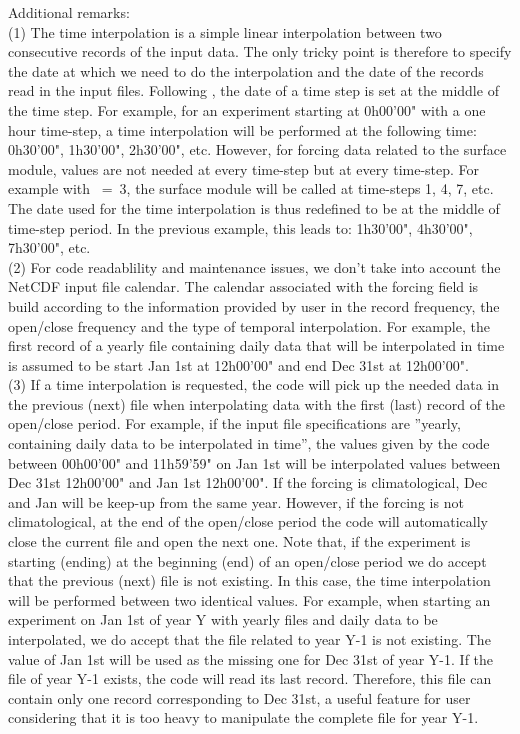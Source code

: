 Additional remarks:\\
(1) The time interpolation is a simple linear interpolation between two consecutive records of 
the input data. The only tricky point is therefore to specify the date at which we need to do 
the interpolation and the date of the records read in the input files. 
Following \citet{Leclair_Madec_OM09}, the date of a time step is set at the middle of the 
time step. For example, for an experiment starting at 0h00'00" with a one hour time-step, 
a time interpolation will be performed at the following time: 0h30'00", 1h30'00", 2h30'00", etc.
However, for forcing data related to the surface module, values are not needed at every 
time-step but at every  time-step. For example with ~=~3, 
the surface module will be called at time-steps 1, 4, 7, etc. The date used for the time interpolation 
is thus redefined to be at the middle of  time-step period. In the previous example, 
this leads to: 1h30'00", 4h30'00", 7h30'00", etc. \\ 
(2) For code readablility and maintenance issues, we don't take into account the NetCDF input file 
calendar. The calendar associated with the forcing field is build according to the information 
provided by user in the record frequency, the open/close frequency and the type of temporal interpolation. 
For example, the first record of a yearly file containing daily data that will be interpolated in time 
is assumed to be start Jan 1st at 12h00'00" and end Dec 31st at 12h00'00". \\
(3) If a time interpolation is requested, the code will pick up the needed data in the previous (next) file 
when interpolating data with the first (last) record of the open/close period. 
For example, if the input file specifications are ''yearly, containing daily data to be interpolated in time'', 
the values given by the code between 00h00'00" and 11h59'59" on Jan 1st will be interpolated values 
between Dec 31st 12h00'00" and Jan 1st 12h00'00". If the forcing is climatological, Dec and Jan will 
be keep-up from the same year. However, if the forcing is not climatological, at the end of the 
open/close period the code will automatically close the current file and open the next one. 
Note that, if the experiment is starting (ending) at the beginning (end) of an open/close period 
we do accept that the previous (next) file is not existing. In this case, the time interpolation 
will be performed between two identical values. For example, when starting an experiment on 
Jan 1st of year Y with yearly files and daily data to be interpolated, we do accept that the file 
related to year Y-1 is not existing. The value of Jan 1st will be used as the missing one for 
Dec 31st of year Y-1. If the file of year Y-1 exists, the code will read its last record. 
Therefore, this file can contain only one record corresponding to Dec 31st, a useful feature for 
user considering that it is too heavy to manipulate the complete file for year Y-1.


